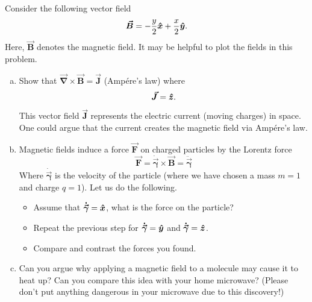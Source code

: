 \documentclass[12pt]{article} %
\newcommand{\grad}{\boldsymbol{\vec{\nabla}}}
\newcommand{\tangentgamma}{\boldsymbol{\dot{\vec{\gamma}}}}
\newcommand{\normalgamma}{\boldsymbol{\ddot{\vec{\gamma}}}}
\newcommand{\vecfieldB}{\boldsymbol{\vec{B}}}
\newcommand{\vecfieldJ}{\boldsymbol{\vec{J}}}
\newcommand{\vecfieldF}{\boldsymbol{\vec{F}}}
\begin{document}
\newpage
\begin{problem}
Consider the following vector field
\[
\vecfieldB = -\frac{y}{2}\xhat + \frac{x}{2}\yhat.
\]
Here, $\vecfieldB$ denotes the magnetic field. It may be helpful to plot the fields in this problem.
\begin{enumerate}[(a)]
    \item Show that $\grad \times \vecfieldB = \vecfieldJ$ (Amp\'ere's law) where 
    \[
    \vecfieldJ = \zhat.
    \]
    This vector field $\vecfieldJ$ represents the electric current (moving charges) in space. One could argue that the current creates the magnetic field via Amp\'ere's law.
    \item Magnetic fields induce a force $\vecfieldF$ on charged particles by the Lorentz force
    \[
    \vecfieldF = \tangentgamma \times \vecfieldB = \normalgamma
    \]
    Where $\tangentgamma$ is the velocity of the particle (where we have chosen a mass $m=1$ and charge $q=1$).  Let us do the following.
    \begin{itemize}
        \item Assume that $\tangentgamma = \xhat$, what is the force on the particle?
        \item Repeat the previous step for $\tangentgamma=\yhat$ and $\tangentgamma=\zhat$. 
        \item Compare and contrast the forces you found.
    \end{itemize}
    \item Can you argue why applying a magnetic field to a molecule may cause it to heat up? Can you compare this idea with your home microwave? (Please don't put anything dangerous in your microwave due to this discovery!)
\end{enumerate}
\end{problem}
\end{document}
